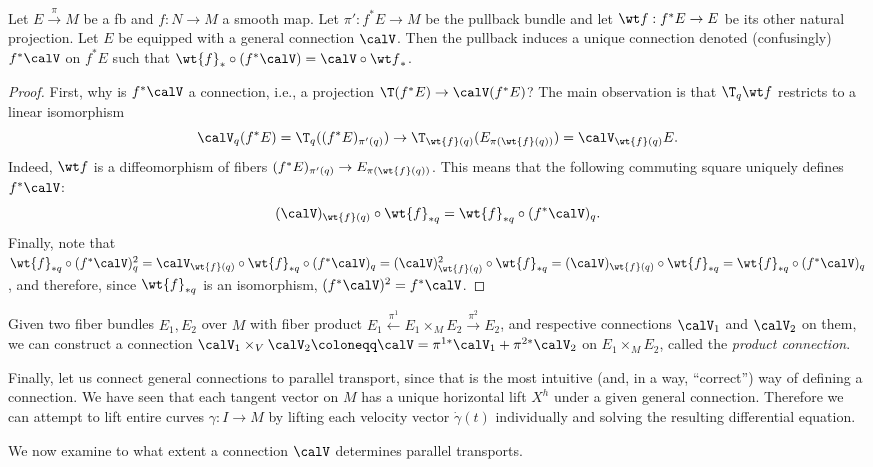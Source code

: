 \begin{prop}
   Let $E\overset{\pi}{\to}M$ be a \gls{fb} and $f:N\to M$ a smooth map. Let $\pi':f^\ast E\to M$ be the pullback bundle and let $\wt f:f^\ast E\to E$ be its other natural projection. Let $E$ be equipped with a general connection $\calV$. Then the pullback induces a unique connection denoted (confusingly) $f^\ast\calV$ on $f^\ast E$ such that $\wt{f}_\ast\circ (f^\ast \calV)=\calV\circ {\wt f}_\ast$.
\end{prop}
\begin{proof}
    First, why is $f^\ast\calV$ a connection, i.e., a projection $\T(f^\ast E)\to \calV(f^\ast E)$? The main observation is that $\T_q{\wt f}$ restricts to a linear isomorphism 
    \[\calV_q (f^\ast E)=\T_q((f^\ast E)_{\pi'(q)})\to \T_{\wt{f}(q)}(E_{\pi(\wt{f}(q))})=\calV_{\wt{f}(q)}E.\]
    Indeed, $\wt f$ is a diffeomorphism of fibers $(f^\ast E)_{\pi'(q)}\to E_{\pi(\wt{f}(q))}$. This means that the following commuting square uniquely defines $f^\ast\calV$:
    \[(\calV)_{\wt{f}(q)}\circ \wt{f}_{\ast q}=\wt{f}_{\ast q}\circ (f^\ast \calV)_q.\]
    Finally, note that $\wt{f}_{\ast q}\circ (f^\ast\calV)^2_q=\calV_{\wt{f}(q)}\circ \wt{f}_{\ast q}\circ (f^\ast\calV)_q=(\calV)^2_{\wt{f}(q)}\circ \wt{f}_{\ast q}=(\calV)_{\wt{f}(q)}\circ \wt{f}_{\ast q}=\wt{f}_{\ast q}\circ (f^\ast \calV)_q$, and therefore, since $\wt{f}_{\ast q}$ is an isomorphism, $(f^\ast\calV)^2=f^\ast\calV$.
\end{proof}

\begin{rem}
    Given two fiber bundles $E_1,E_2$ over $M$ with fiber product $E_1\overset{\pi^1}{\leftarrow}E_1\times_M E_2\overset{\pi^2}{\to}E_2$, and respective connections $\calV_1$ and $\calV_2$ on them, we can construct a connection $\calV_1\times_V\calV_2\coloneqq \calV=\pi^{1\ast}\calV_1+\pi^{2\ast}\calV_2$ on $E_1\times_M E_2$, called the \emph{product connection}.
\end{rem}


Finally, let us connect general connections to parallel transport, since that is the most intuitive (and, in a way, ``correct'') way of defining a connection. We have seen that each tangent vector on $M$ has a unique horizontal lift $X^h$ under a given general connection. Therefore we can attempt to lift entire curves $\gamma:I\to M$ by lifting each velocity vector $\dot\gamma(t)$ individually and solving the resulting differential equation.


We now examine to what extent a connection $\calV$ determines parallel transports.

